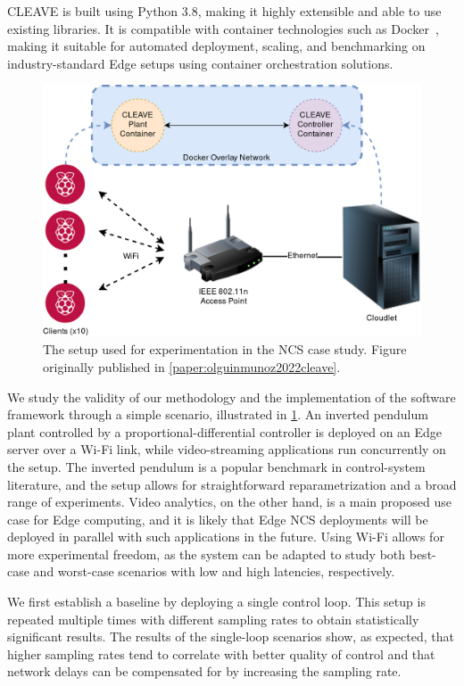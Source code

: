 \gls{CLEAVE} is built using Python 3.8, making it highly extensible and able to use existing libraries.
It is compatible with container technologies such as Docker~\cite{docker}, making it suitable for automated deployment, scaling, and benchmarking on industry-standard Edge setups using container orchestration solutions.

\begin{figure}
    \centering
    \includegraphics[width=.9\textwidth]{publications/2022CLEAVE/images/CLEAVE_experiment_setup}
    \caption{
        The setup used for experimentation in the \gls{NCS} case study.
        Figure originally published in \cref{paper:olguinmunoz2022cleave}.
    }\label{fig:cleavesetup}
\end{figure}

\medskip
We study the validity of our methodology and the implementation of the software framework through a simple scenario, illustrated in \cref{fig:cleavesetup}.
An inverted pendulum plant controlled by a proportional-differential controller is deployed on an Edge server over a Wi-Fi link, while video-streaming applications run concurrently on the setup.
The inverted pendulum is a popular benchmark in control-system literature, and the setup allows for straightforward reparametrization and a broad range of experiments.
Video analytics, on the other hand, is a main proposed use case for Edge computing, and it is likely that Edge \gls{NCS} deployments will be deployed in parallel with such applications in the future.
Using Wi-Fi allows for more experimental freedom, as the system can be adapted to study both best-case and worst-case scenarios with low and high latencies, respectively.

We first establish a baseline by deploying a single control loop.
This setup is repeated multiple times with different sampling rates to obtain statistically significant results.
The results of the single-loop scenarios show, as expected, that higher sampling rates tend to correlate with better quality of control and that network delays can be compensated for by increasing the sampling rate.

